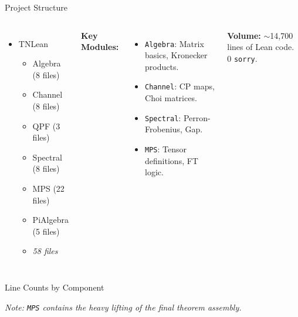 \documentclass[aspectratio=169,10pt]{beamer}
\begin{document}
\begin{frame}{Project Structure}
    \begin{columns}[T]
        \begin{itemize}
            \item[$\bullet$] TNLean
            \begin{itemize}
                \item[$\circ$] Algebra (8 files)
                \item[$\circ$] Channel (8 files)
                \item[$\circ$] QPF (3 files)
                \item[$\circ$] Spectral (8 files)
                \item[$\circ$] MPS (22 files)
                \item[$\circ$] PiAlgebra (5 files)
                \item[$\textit{Total}$] \textit{58 files}
            \end{itemize}
        \end{itemize}
        
        \textbf{Key Modules:}
        \begin{itemize}
            \item \texttt{Algebra}: Matrix basics, Kronecker products.
            \item \texttt{Channel}: CP maps, Choi matrices.
            \item \texttt{Spectral}: Perron-Frobenius, Gap.
            \item \texttt{MPS}: Tensor definitions, FT logic.
        \end{itemize}
        
        \vspace{1em}
        \textbf{Volume:}
        $\sim$14,700 lines of Lean code.
        0 \texttt{sorry}.
    \end{columns}
\end{frame}

\begin{frame}{Line Counts by Component}
    \begin{center}
    \end{center}
    
    \emph{Note: \texttt{MPS} contains the heavy lifting of the final theorem assembly.}
\end{frame}
\end{document}
